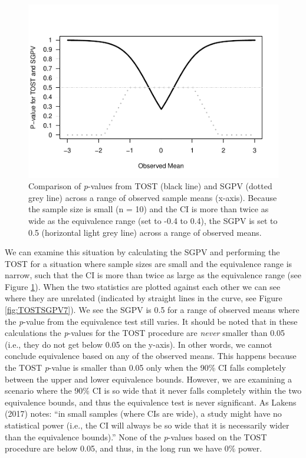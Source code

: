\documentclass[floatsintext,man]{apa6}
\theoremstyle{definition}
\theoremstyle{definition}
\theoremstyle{definition}
\theoremstyle{remark}
\begin{document}
\begin{figure}
\centering
\includegraphics{manuscript_files/figure-latex/TOSTSGPV6-1.pdf}
\caption{\label{fig:TOSTSGPV6}Comparison of \emph{p}-values from TOST (black
line) and SGPV (dotted grey line) across a range of observed sample
means (x-axis). Because the sample size is small (n = 10) and the CI is
more than twice as wide as the equivalence range (set to -0.4 to 0.4),
the SGPV is set to 0.5 (horizontal light grey line) across a range of
observed means.}
\end{figure}

We can examine this situation by calculating the SGPV and performing the
TOST for a situation where sample sizes are small and the equivalence
range is narrow, such that the CI is more than twice as large as the
equivalence range (see Figure \ref{fig:TOSTSGPV6}). When the two
statistics are plotted against each other we can see where they are
unrelated (indicated by straight lines in the curve, see Figure
\ref{fig:TOSTSGPV7}). We see the SGPV is 0.5 for a range of observed
means where the \emph{p}-value from the equivalence test still varies.
It should be noted that in these calculations the \emph{p}-values for
the TOST procedure are \emph{never} smaller than 0.05 (i.e., they do not
get below 0.05 on the y-axis). In other words, we cannot conclude
equivalence based on any of the observed means. This happens because the
TOST \emph{p}-value is smaller than 0.05 only when the 90\% CI falls
completely between the upper and lower equivalence bounds. However, we
are examining a scenario where the 90\% CI is so wide that it never
falls completely within the two equivalence bounds, and thus the
equivalence test is never significant. As Lakens (2017) notes:
\enquote{in small samples (where CIs are wide), a study might have no
statistical power (i.e., the CI will always be so wide that it is
necessarily wider than the equivalence bounds).} None of the
\emph{p}-values based on the TOST procedure are below 0.05, and thus, in
the long run we have 0\% power.
\end{document}
